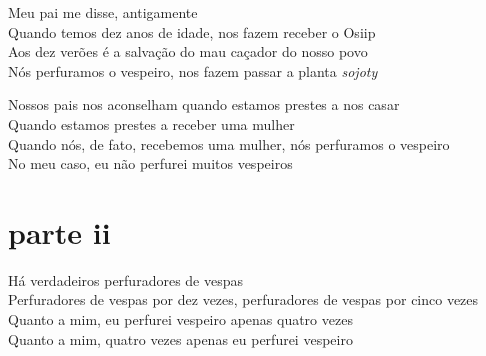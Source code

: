  \noindent Meu pai me disse, antigamente\\
 Quando temos dez anos de idade, nos fazem receber o Osiip\\
 Aos dez verões é a salvação do mau caçador do nosso povo\\
 Nós perfuramos o vespeiro, nos fazem passar a planta \textit{sojoty}

\smallskip
 \begin{center}\end{center}
 \smallskip
 
\noindent Nossos pais nos aconselham quando estamos prestes a nos casar\\
 Quando estamos prestes a receber uma mulher\\
 Quando nós, de fato, recebemos uma mulher, nós perfuramos o vespeiro\\
 No meu caso, eu não perfurei muitos vespeiros
 
 
\medskip
\section{parte ii}

 \noindent Há verdadeiros perfuradores de vespas\\
 Perfuradores de vespas por dez vezes, perfuradores de vespas por cinco vezes\\
 Quanto a mim, eu perfurei vespeiro apenas quatro vezes\\
 Quanto a mim, quatro vezes apenas eu perfurei vespeiro
 
